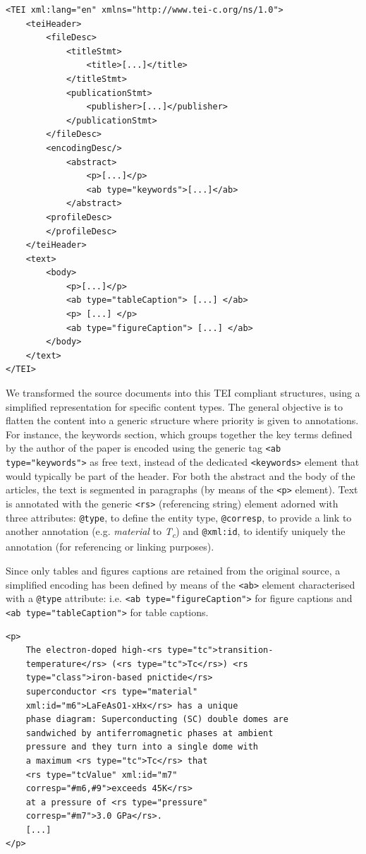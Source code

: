 \documentclass[fleqn,10pt]{wlscirep}
\begin{document}
\begin{verbatim}
<TEI xml:lang="en" xmlns="http://www.tei-c.org/ns/1.0">
    <teiHeader>
        <fileDesc>
            <titleStmt>
                <title>[...]</title>
            </titleStmt>
            <publicationStmt>
                <publisher>[...]</publisher>
            </publicationStmt>
        </fileDesc>
        <encodingDesc/>
            <abstract>
                <p>[...]</p>
                <ab type="keywords">[...]</ab>
            </abstract>
        <profileDesc>
        </profileDesc>
    </teiHeader>
    <text>
        <body>
            <p>[...]</p>
            <ab type="tableCaption"> [...] </ab>
            <p> [...] </p>
            <ab type="figureCaption"> [...] </ab> 
        </body>
    </text>
</TEI>
\end{verbatim}

We transformed the source documents into this TEI compliant structures, using a simplified representation for specific content types. The general objective is to flatten the content into a generic structure where priority is given to annotations.
For instance, the keywords section, which groups together the key terms defined by the author of the paper is encoded using the generic tag \texttt{<ab type="keywords">} as free text, instead of the dedicated \texttt{<keywords>} element that would typically be part of the header. 
For both the abstract and the body of the articles, the text is segmented in paragraphs (by means of the \texttt{<p>} element). 
Text is annotated with the generic \texttt{<rs>} (referencing string) element adorned with three attributes: \texttt{@type}, to define the entity type, \texttt{@corresp}, to provide a link to another annotation (e.g. \textit{material} to \textit{T\textsubscript{c}}) and \texttt{@xml:id}, to identify uniquely the annotation (for referencing or linking purposes).

Since only tables and figures captions are retained from the original source, a simplified encoding has been defined by means of the \texttt{<ab>} element characterised with a   \texttt{@type} attribute: i.e. \texttt{<ab type="figureCaption">} for figure captions and \texttt{<ab type="tableCaption">} for table captions.

\begin{verbatim}
<p>
    The electron-doped high-<rs type="tc">transition-
    temperature</rs> (<rs type="tc">Tc</rs>) <rs 
    type="class">iron-based pnictide</rs> 
    superconductor <rs type="material" 
    xml:id="m6">LaFeAsO1-xHx</rs> has a unique 
    phase diagram: Superconducting (SC) double domes are 
    sandwiched by antiferromagnetic phases at ambient 
    pressure and they turn into a single dome with 
    a maximum <rs type="tc">Tc</rs> that 
    <rs type="tcValue" xml:id="m7" 
    corresp="#m6,#9">exceeds 45K</rs> 
    at a pressure of <rs type="pressure" 
    corresp="#m7">3.0 GPa</rs>. 
    [...]
</p>
\end{verbatim}
\end{document}
